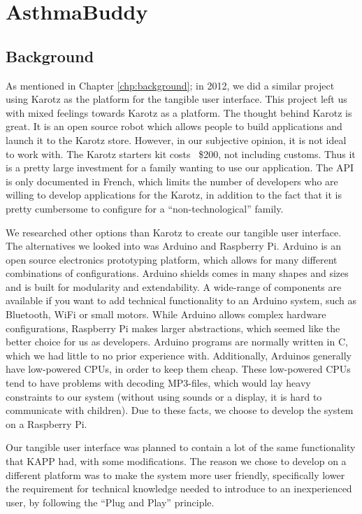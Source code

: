 
\chapter{AsthmaBuddy}
\label{chp:our-solution}

\section{Background}
As mentioned in Chapter \ref{chp:background}; in 2012, we did a similar project using Karotz as the platform for the tangible user interface\cite{CustomerDriven}.
This project left us with mixed feelings towards Karotz as a platform. The thought behind Karotz is great. It is an open source robot which allows people to build applications and launch it to the Karotz store. However, in our subjective opinion, it is not ideal to work with. The Karotz starters kit costs ~\$200, not including customs. Thus it is a pretty large investment for a family wanting to use our application. The API is only documented in French, which limits the number of developers who are willing to develop applications for the Karotz, in addition to the fact that it is pretty cumbersome to configure for a ``non-technological'' family. 

We researched other options than Karotz to create our tangible user interface. The alternatives we looked into was Arduino and Raspberry Pi. Arduino is an open source electronics prototyping platform\cite{arduino}, which allows for many different combinations of configurations. Arduino shields comes in many shapes and sizes and is built for modularity and extendability. A wide-range of components are available if you want to add technical functionality to an Arduino system, such as Bluetooth, WiFi or small motors. 
While Arduino allows complex hardware configurations, Raspberry Pi makes larger abstractions, which seemed like the better choice for us as developers. Arduino programs are normally written in C\cite{strahl2000language}, which we had little to no prior experience with. Additionally, Arduinos generally have low-powered CPUs, in order to keep them cheap. These low-powered CPUs tend to have problems with decoding MP3-files, which would lay heavy constraints to our system (without using sounds or a display, it is hard to communicate with children). Due to these facts, we choose to develop the system on a Raspberry Pi.

Our tangible user interface was planned to contain a lot of the same functionality that KAPP had, with some modifications. The reason we chose to develop on a different platform was to make the system more user friendly, specifically lower the requirement for technical knowledge needed to introduce \ab{} to an inexperienced user, by following the ``Plug and Play'' principle.
 
